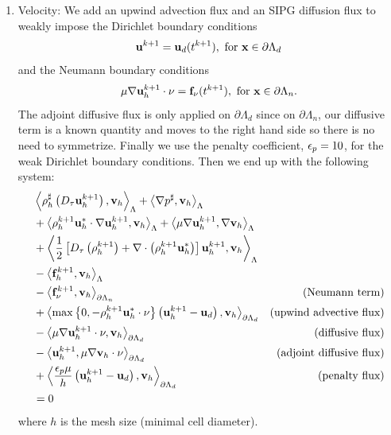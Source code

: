 \documentclass[letterpaper]{erdc}
\begin{document}
\begin{enumerate}
\item Velocity: We add an upwind advection flux and an SIPG diffusion flux to
  weakly impose the Dirichlet boundary conditions
\begin{equation}
  \textbf{u}^{k+1} = \textbf{u}_d(t^{k+1}),  \mbox{ for } \textbf{x} \in \partial\Lambda_d
\end{equation}
and the Neumann boundary conditions
\begin{equation}
  \mu\nabla\textbf{u}^{k+1}_h\cdot\nu = \mathbf{f}_{\nu}(t^{k+1}),  \mbox{ for } \textbf{x} \in \partial\Lambda_n.
\end{equation}
The adjoint diffusive flux is only applied on $\partial\Lambda_d$ since on
$\partial\Lambda_n$, our diffusive term is a known quantity and moves to the
right hand side so there is no need to symmetrize.  Finally we use the penalty
coefficient, $\epsilon_p = 10$, for the weak Dirichlet boundary conditions.  Then
we end up with the following system:
\begin{align*}
  &\left\langle  \rho^{\sharp}_h\left(D_{\tau}\textbf{u}_h^{k+1}\right),  \textbf{v}_h  \right\rangle_{\Lambda} + \left\langle  \nabla p^{\sharp},  \textbf{v}_h  \right\rangle_{\Lambda} &\\
   &+ \left\langle  \rho^{k+1}_h \textbf{u}^{*}_h\cdot\nabla \textbf{u}^{k+1}_h,  \textbf{v}_h  \right\rangle_{\Lambda} + \left\langle  \mu \nabla \textbf{u}^{k+1}_h,  \nabla \textbf{v}_h  \right\rangle_{\Lambda} &\\
   &+ \left\langle  \frac{1}{2}\left[ D_{\tau}\left(\rho_h^{k+1}\right) + \nabla\cdot\left( \rho_h^{k+1}\textbf{u}_h^{*} \right)\right] \textbf{u}_h^{k+1},  \textbf{v}_h  \right\rangle_{\Lambda} &\\
   &- \left\langle  \mathbf{f}^{k+1}_h ,  \textbf{v}_h  \right\rangle_{\Lambda} &\\
   &- \left\langle  \mathbf{f}^{k+1}_{\nu},  \textbf{v}_h  \right\rangle_{\partial\Lambda_n}                                                   &\mbox{(Neumann term)}\\
   &+ \left\langle  \max\left\{0, -\rho^{k+1}_h \textbf{u}^{*}_h\cdot\nu\right\} \left(\textbf{u}^{k+1}_h - \textbf{u}_d\right),  \textbf{v}_h  \right\rangle_{\partial\Lambda_d}     &\mbox{(upwind advective flux)}\\
   &- \left\langle  \mu \nabla \textbf{u}^{k+1}_h\cdot\nu,  \textbf{v}_h  \right\rangle_{\partial\Lambda_d}                          &\mbox{(diffusive flux)}\\
   &- \left\langle  \textbf{u}^{k+1}_h,  \mu \nabla \textbf{v}_h\cdot\nu  \right\rangle_{\partial\Lambda_d}                          &\mbox{(adjoint diffusive flux)}\\
   &+ \left\langle  \frac{\epsilon_p\mu}{h} \left(\textbf{u}^{k+1}_h - \textbf{u}_d\right),  \textbf{v}_h  \right\rangle_{\partial\Lambda_d}                     &\mbox{(penalty flux)}\\
   & = 0&
\end{align*}
where $h$ is the mesh size (minimal cell diameter).


\end{enumerate}
\end{document}
